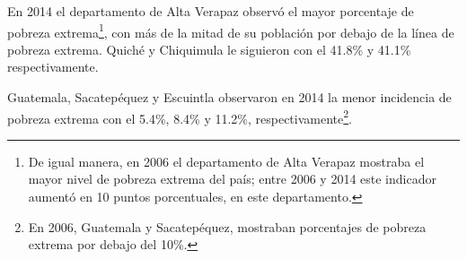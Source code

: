 En 2014 el departamento de Alta Verapaz observó el mayor porcentaje de pobreza extrema\footnote{De igual manera, en 2006 el departamento de Alta Verapaz mostraba el mayor nivel de pobreza extrema del país; entre 2006 y 2014 este indicador aumentó en 10 puntos porcentuales, en este departamento.},  con más de la mitad de su  población por debajo de la línea de pobreza extrema. Quiché y Chiquimula le siguieron  con el 41.8\% y 41.1\% respectivamente. 

Guatemala, Sacatepéquez y Escuintla observaron en 2014 la menor incidencia de pobreza extrema con el 5.4\%, 8.4\% y
11.2\%, respectivamente\footnote{En 2006, Guatemala y Sacatepéquez, mostraban porcentajes de pobreza extrema por debajo del 10\%.}.


